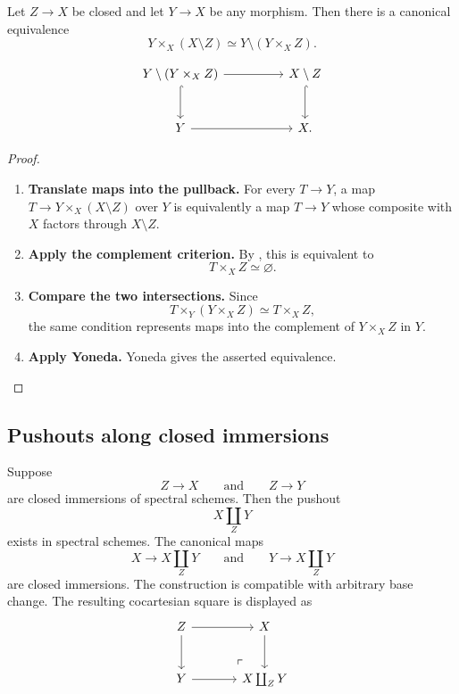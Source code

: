\begin{proposition}
\label{prop:complement-base-change}
Let \(Z\to X\) be closed and let \(Y\to X\) be any morphism. Then there is
a canonical equivalence
\[
    Y\times_X(X\setminus Z)
    \simeq
    Y\setminus(Y\times_XZ).
\]
\end{proposition}

\[
\begin{tikzcd}[column sep=huge, row sep=large]
    Y\setminus(Y\times_XZ)
        \arrow[r]
        \arrow[d, hook]
    &
    X\setminus Z
        \arrow[d, hook]
    \\
    Y
        \arrow[r]
    &
    X.
\end{tikzcd}
\]


\begin{proof}
\leavevmode
\begin{enumerate}[label=\textup{(\arabic*)}]
    \item \textbf{Translate maps into the pullback.}
    For every \(T\to Y\), a map
    \(T\to Y\times_X(X\setminus Z)\) over \(Y\) is equivalently a map
    \(T\to Y\) whose composite with \(X\) factors through
    \(X\setminus Z\).

    \item \textbf{Apply the complement criterion.}
    By , this is
    equivalent to
    \[
        T\times_XZ\simeq\varnothing.
    \]

    \item \textbf{Compare the two intersections.}
    Since
    \[
        T\times_Y(Y\times_XZ)
        \simeq
        T\times_XZ,
    \]
    the same condition represents maps into the complement of
    \(Y\times_XZ\) in \(Y\).

    \item \textbf{Apply Yoneda.}
    Yoneda gives the asserted equivalence.
\end{enumerate}
\end{proof}

\subsection{Pushouts along closed immersions}

\begin{theorem}
\label{thm:closed-pushouts-spectral-schemes}
Suppose
\[
    Z
    \longrightarrow
    X
    \qquad\text{and}\qquad
    Z
    \longrightarrow
    Y
\]
are closed immersions of spectral schemes. Then the pushout
\[
    X\coprod_ZY
\]
exists in spectral schemes. The canonical maps
\[
    X
    \longrightarrow
    X\coprod_ZY
    \qquad\text{and}\qquad
    Y
    \longrightarrow
    X\coprod_ZY
\]
are closed immersions. The construction is compatible with arbitrary
base change. The resulting cocartesian square is displayed as
\[
\begin{tikzcd}[column sep=large, row sep=large]
    Z
        \arrow[r]
        \arrow[d]
    &
    X
        \arrow[d]
    \\
    Y
        \arrow[r]
    &
    X\coprod_ZY
        \arrow[ul, phantom, very near start, "\ulcorner"]
\end{tikzcd}
\]
\end{theorem}

